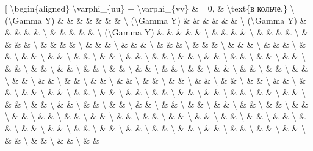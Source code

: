 \documentclass[
]{article}
\begin{document}
{[} \textbackslash begin\{aligned\} \textbackslash varphi\_\{uu\} +
\textbackslash varphi\_\{vv\} \&= 0, \& \textbackslash text\{в кольче,\}
\textbackslash{} (\textbackslash Gamma Y) \& \& \& \& \& \& \&
\textbackslash{} (\textbackslash Gamma Y) \& \& \& \& \& \&
\textbackslash{} (\textbackslash Gamma Y) \& \& \& \& \&
\textbackslash{} \& \& \& \& \& \textbackslash{} (\textbackslash Gamma
Y) \& \& \& \& \& \textbackslash{} \& \& \& \& \textbackslash{} \& \& \&
\& \textbackslash{} \& \& \& \& \textbackslash{} \& \& \& \&
\textbackslash{} \& \& \& \textbackslash{} \& \& \& \textbackslash{} \&
\& \& \textbackslash{} \& \& \& \textbackslash{} \& \& \&
\textbackslash{} \& \& \& \textbackslash{} \& \& \textbackslash{} \& \&
\textbackslash{} \& \& \textbackslash{} \& \& \textbackslash{} \& \&
\textbackslash{} \& \& \textbackslash{} \& \& \textbackslash{} \& \&
\textbackslash{} \& \& \textbackslash{} \& \& \textbackslash{} \& \&
\textbackslash{} \& \& \textbackslash{} \& \& \textbackslash{} \& \&
\textbackslash{} \& \& \textbackslash{} \& \& \textbackslash{} \& \&
\textbackslash{} \& \& \textbackslash{} \& \& \textbackslash{} \& \&
\textbackslash{} \& \& \textbackslash{} \& \& \textbackslash{} \& \&
\textbackslash{} \& \& \textbackslash{} \& \& \textbackslash{} \& \&
\textbackslash{} \& \& \textbackslash{} \& \& \textbackslash{} \& \&
\textbackslash{} \& \& \textbackslash{} \& \& \textbackslash{} \& \&
\textbackslash{} \& \& \textbackslash{} \& \& \textbackslash{} \& \&
\textbackslash{} \& \& \textbackslash{} \& \& \textbackslash{} \& \&
\textbackslash{} \& \& \textbackslash{} \& \& \textbackslash{} \& \&
\textbackslash{} \& \& \textbackslash{} \& \& \textbackslash{} \& \&
\textbackslash{} \& \& \textbackslash{} \& \& \textbackslash{} \& \&
\textbackslash{} \& \& \textbackslash{} \& \& \textbackslash{} \& \&
\textbackslash{} \& \& \textbackslash{} \& \& \textbackslash{} \& \&
\textbackslash{} \& \& \textbackslash{} \& \& \textbackslash{} \& \&
\textbackslash{} \& \& \textbackslash{} \& \& \textbackslash{} \& \&
\textbackslash{} \& \& \textbackslash{} \& \& \textbackslash{} \& \&
\textbackslash{} \& \& \textbackslash{} \& \& \textbackslash{} \& \&
\textbackslash{} \& \& \textbackslash{} \& \& \textbackslash{} \& \&
\textbackslash{} \& \& \textbackslash{} \& \& \textbackslash{} \& \&
\textbackslash{} \& \& \textbackslash{} \& \& \textbackslash{} \& \&
\textbackslash{} \& \& \textbackslash{} \& \& \textbackslash{} \& \&
\textbackslash{} \& \& \textbackslash{} \& \& \textbackslash{} \& \&
\textbackslash{} \& \& \textbackslash{} \& \& \textbackslash{} \& \&
\textbackslash{} \& \& \textbackslash{} \& \& \textbackslash{} \& \&
\end{document}

